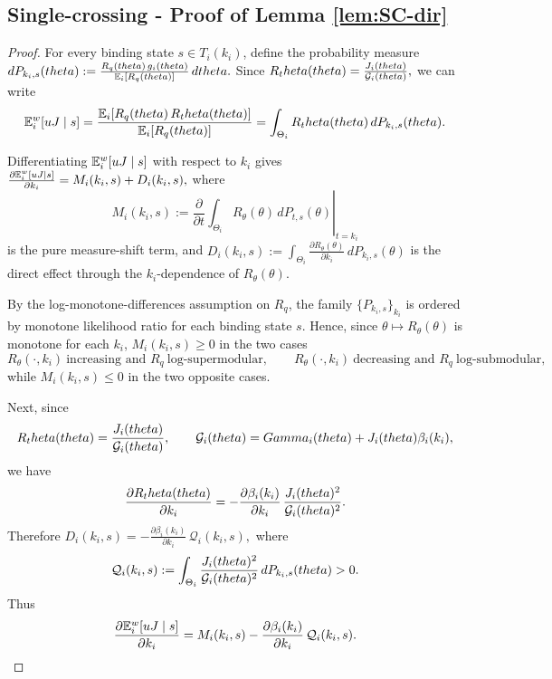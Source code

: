 \documentclass{class}
\begin{document}
\subsection{Single-crossing - Proof of Lemma \ref{lem:SC-dir}}\label{proof:SC-dir}


\begin{proof}
For every binding state $s\in T_i(k_i)$, define the probability measure
$dP_{k_i,s}(theta):= \frac{R_q(theta)\,g_i(theta)} {\mathbb{E}_i[R_q(theta)]}\,dtheta.$
Since
$R_theta(theta)=\frac{J_i(theta)}{\mathcal{G}_i(theta)},$
we can write
\[
 \mathbb{E}_i^w[uJ\mid s]
=
\frac{\mathbb{E}_i\!\left[R_q(theta)\,R_theta(theta)\right]}
{\mathbb{E}_i\!\left[R_q(theta)\right]}
=
\int_{\Theta_i} R_theta(theta)\,dP_{k_i,s}(theta).
\]

Differentiating $ \mathbb{E}_i^w[uJ\mid s]$ with respect to $k_i$ gives
$\frac{\partial  \mathbb{E}_i^w[uJ\mid s]}{\partial k_i} = M_i(k_i,s)+D_i(k_i,s),$
where
\[
M_i(k_i,s)
:=
\left.
\frac{\partial}{\partial t}
\int_{\Theta_i}R_\theta(\theta)\,dP_{t,s}(\theta)
\right|_{t=k_i}
\]
is the pure measure-shift term, and
$D_i(k_i,s) := \int_{\Theta_i} \frac{\partial R_\theta(\theta)}{\partial k_i}\,dP_{k_i,s}(\theta)$
is the direct effect through the $k_i$-dependence of $R_\theta(\theta)$.

By the log-monotone-differences assumption on $R_q$, the family $\{P_{k_i,s}\}_{k_i}$ is ordered by monotone likelihood ratio for each binding state $s$. Hence, since $\theta\mapsto R_\theta(\theta)$ is monotone for each $k_i$,
$M_i(k_i,s)\ge 0$
in the two cases
\[
R_\theta(\cdot,k_i)\ \text{increasing and }R_q\ \text{log-supermodular},
\qquad
R_\theta(\cdot,k_i)\ \text{decreasing and }R_q\ \text{log-submodular},
\]
while
$M_i(k_i,s)\le 0$
in the two opposite cases.

Next, since
\[
R_theta(theta)=\frac{J_i(theta)}{\mathcal{G}_i(theta)},
\qquad
\mathcal{G}_i(theta)=Gamma_i(theta)+J_i(theta)\beta_i(k_i),
\]
we have
\[
\frac{\partial R_theta(theta)}{\partial k_i}
=
-\frac{\partial \beta_i(k_i)}{\partial k_i}\,
\frac{J_i(theta)^2}{\mathcal{G}_i(theta)^2}.
\]
Therefore
$D_i(k_i,s) = -\frac{\partial \beta_i(k_i)}{\partial k_i}\,\mathcal Q_i(k_i,s),$
where
\[
\mathcal Q_i(k_i,s)
:=
\int_{\Theta_i}
\frac{J_i(theta)^2}{\mathcal{G}_i(theta)^2}\,dP_{k_i,s}(theta)
>0.
\]
Thus
\[
\frac{\partial  \mathbb{E}_i^w[uJ\mid s]}{\partial k_i}
=
M_i(k_i,s)-\frac{\partial \beta_i(k_i)}{\partial k_i}\,\mathcal Q_i(k_i,s).
\]


\end{proof}
\end{document}

